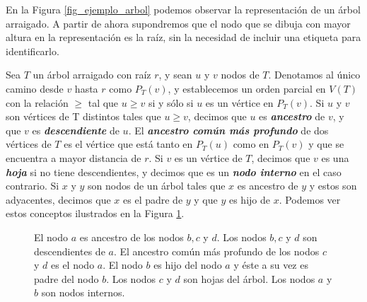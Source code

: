 En la Figura \ref{fig_ejemplo_arbol} podemos observar la representación de un árbol arraigado. A partir de ahora supondremos que el nodo que se dibuja con mayor altura en la representación es la raíz, sin la necesidad de incluir una etiqueta para identificarlo.

Sea $T$ un árbol arraigado con raíz $r$, y sean $u$ y $v$ nodos de $T$. Denotamos al único camino desde $v$ hasta $r$ como $P_T(v)$, y establecemos un orden parcial en $V(T)$ con la relación $\geq$ tal que $u \geq v$ si y sólo si $u$ es un vértice en $P_T(v)$. Si $u$ y $v$ son vértices de T distintos tales que $u \geq v$, decimos que $u$ es \textbf{\emph{ancestro}} de $v$, y que $v$ es \textbf{\emph{descendiente}} de $u$. El \textbf{\emph{ancestro común más profundo}} de dos vértices de $T$ es el vértice que está tanto en $P_T(u)$ como en $P_T(v)$ y que se encuentra a mayor distancia de $r$. Si $v$ es un vértice de $T$, decimos que $v$ es una \textbf{\emph{hoja}} si no tiene descendientes, y decimos que es un \textbf{\emph{nodo interno}} en el caso contrario. Si $x$ y $y$ son nodos de un árbol tales que $x$ es ancestro de $y$ y estos son adyacentes, decimos que $x$ es el padre de $y$ y que $y$ es hijo de $x$. Podemos ver estos conceptos ilustrados en la Figura \ref{fig_ejemplo_arbol_2}.

\begin{figure}[!htbp]
\centering
\begin{subfigure}{\textwidth}
\centering
{}
\end{subfigure}
\caption{El nodo $a$ es ancestro de los nodos $b,c $ y $d$. Los nodos $b,c $ y $d$ son descendientes de $a$. El ancestro común más profundo de los nodos $c$ y $d$ es el nodo $a$. El nodo $b$ es hijo del nodo $a$ y éste a su vez es padre del nodo $b$. Los nodos $c$ y $d$ son hojas del árbol. Los nodos $a$ y $b$ son nodos internos.}
\label{fig_ejemplo_arbol_2}
\end{figure}


